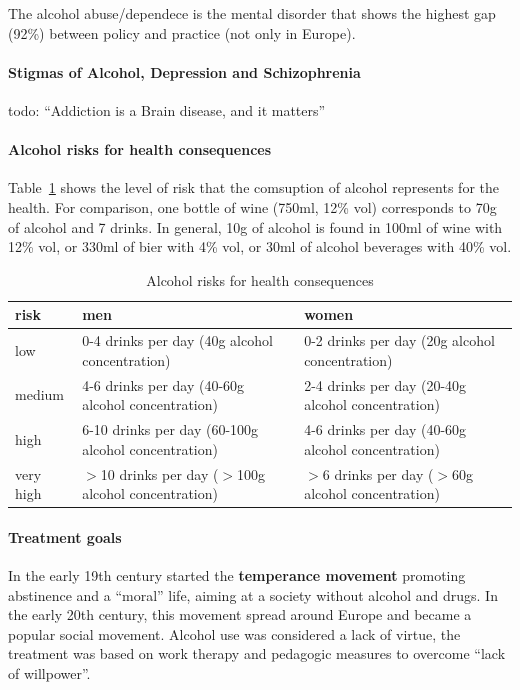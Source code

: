 \documentclass[12pt,article,oneside,a4paper]{memoir}
\begin{document}
The alcohol abuse/dependece is the mental disorder that shows the highest gap
(92\%) between policy and practice (not only in Europe).

\paragraph{Stigmas of Alcohol, Depression and Schizophrenia}
 todo: ``Addiction is a Brain disease, and it matters''

\paragraph{Alcohol risks for health consequences} 

Table~\ref{table:alcohol-risks} shows the level of risk that the comsuption of
alcohol represents for the health. For comparison, one bottle of wine (750ml,
12\% vol) corresponds to 70g of alcohol and 7 drinks. In general, 10g of
alcohol is found in 100ml of wine with 12\% vol, or 330ml of bier with 4\% vol,
or 30ml of alcohol beverages with 40\% vol.

\begin{table}
  \begin{tabular}{ p{4cm} | p{5cm} | p{5cm} }
    \hline
    risk & men & women \\ \hline
	\hline
    low & 0-4 drinks per day (40g alcohol concentration) & 0-2 drinks per day
    (20g alcohol concentration) \\ \hline
    medium & 4-6 drinks per day (40-60g alcohol concentration) & 2-4 drinks per
    day (20-40g alcohol concentration) \\ \hline
    high & 6-10 drinks per day (60-100g alcohol concentration) & 4-6 drinks per
    day (40-60g alcohol concentration) \\ \hline
    very high & $>$10 drinks per day ($>$100g alcohol concentration) & $>$6
    drinks per day ($>$60g alcohol concentration) \\ 
    \hline
  \end{tabular}
  \caption{Alcohol risks for health consequences}
  \label{table:alcohol-risks}
\end{table}

\paragraph{Treatment goals} 
In the early 19th century started the \textbf{temperance movement} promoting
abstinence and a ``moral'' life, aiming at a society without alcohol and drugs.
In the early 20th century, this movement spread around Europe and became a
popular social movement. Alcohol use was considered a lack of virtue, the
treatment was based on work therapy and pedagogic measures to overcome ``lack
of willpower''.
\end{document}
